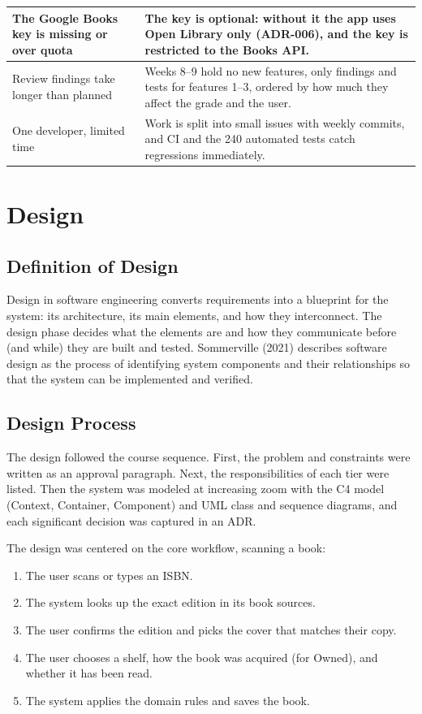 \documentclass[12pt]{article}
\begin{document}
\begin{longtable}{|L{4.6cm}|L{10cm}|}
\hline
The Google Books key is missing or over quota & The key is optional: without it the app uses Open Library only (ADR-006), and the key is restricted to the Books API. \\
\hline
Review findings take longer than planned & Weeks 8--9 hold no new features, only findings and tests for features 1--3, ordered by how much they affect the grade and the user. \\
\hline
One developer, limited time & Work is split into small issues with weekly commits, and CI and the 240 automated tests catch regressions immediately. \\
\hline
\end{longtable}

\section{Design}

\subsection{Definition of Design}

Design in software engineering converts requirements into a blueprint for the system: its architecture, its main elements, and how they interconnect. The design phase decides what the elements are and how they communicate before (and while) they are built and tested. Sommerville (2021) describes software design as the process of identifying system components and their relationships so that the system can be implemented and verified.

\subsection{Design Process}

The design followed the course sequence. First, the problem and constraints were written as an approval paragraph. Next, the responsibilities of each tier were listed. Then the system was modeled at increasing zoom with the C4 model (Context, Container, Component) and UML class and sequence diagrams, and each significant decision was captured in an ADR.

The design was centered on the core workflow, scanning a book:
\begin{enumerate}
    \item The user scans or types an ISBN.
    \item The system looks up the exact edition in its book sources.
    \item The user confirms the edition and picks the cover that matches their copy.
    \item The user chooses a shelf, how the book was acquired (for Owned), and whether it has been read.
    \item The system applies the domain rules and saves the book.
\end{enumerate}
\end{document}
